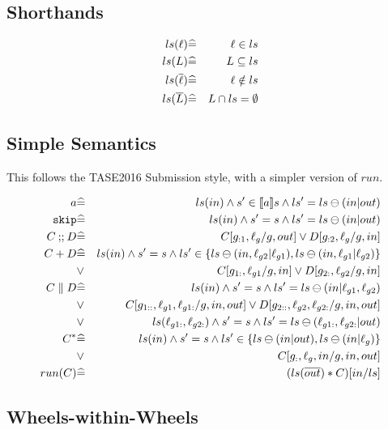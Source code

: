 \subsection{Shorthands}

\begin{eqnarray*}
   ls(\ell) &\widehat=& \ell \in ls
\\ ls(L) &\widehat=& L \subseteq ls
\\ ls(\overline{\ell}) &\widehat=& \ell \notin ls
\\ ls(\overline{L}) &\widehat=& L \cap ls = \emptyset
\end{eqnarray*}

\subsection{Simple Semantics}

This follows the TASE2016 Submission style,
with a simpler version of $run$.

\begin{eqnarray*}
   a
   &\widehat=&
   ls(in) \land s' \in [\![{a}]\!] s \land ls'=ls \ominus (in|out)
\\ \texttt{skip}
   &\widehat=&
   ls(in) \land s' = s \land ls'=ls \ominus (in|out)
\\ C \mathbin{;\!;} D
   &\widehat=&
   C[g_{:1},\ell_g/g,out] \lor D[g_{:2},\ell_g/g,in]
\\ C + D
   &\widehat=&
   ls(in)
   \land s' = s
   \land ls' \in \{ ls \ominus (in,\ell_{g2}|\ell_{g1})
                  , ls \ominus (in,\ell_{g1}|\ell_{g2})\}
\\ &\lor&
   C[g_{1:},\ell_{g1}/g,in] \lor D[g_{2:},\ell_{g2}/g,in]
\\ C \parallel D
   &\widehat=&
   ls(in)
   \land s' = s
   \land ls'= ls \ominus (in|\ell_{g1},\ell_{g2})
\\ &\lor&
   C[g_{1::},\ell_{g1},\ell_{g1:}/g,in,out]
   \lor D[g_{2::},\ell_{g2},\ell_{g2:}/g,in,out]
\\ &\lor&
   ls(\ell_{g1:},\ell_{g2:})
   \land s' = s
   \land ls'= ls \ominus (\ell_{g1:},\ell_{g2:}|out)
\\ C^*
   &\widehat=&
   ls(in)
   \land s' = s
   \land ls' \in \{ ls \ominus (in|out), ls \ominus (in|\ell_g)\}
\\ &\lor&
   C[g_{:},\ell_g,in/g,in,out]
\\ run(C)
   &\widehat=&
   ( ls(\overline{out}) * C)[in/ls]
\end{eqnarray*}


\newpage
\subsection{Wheels-within-Wheels}

